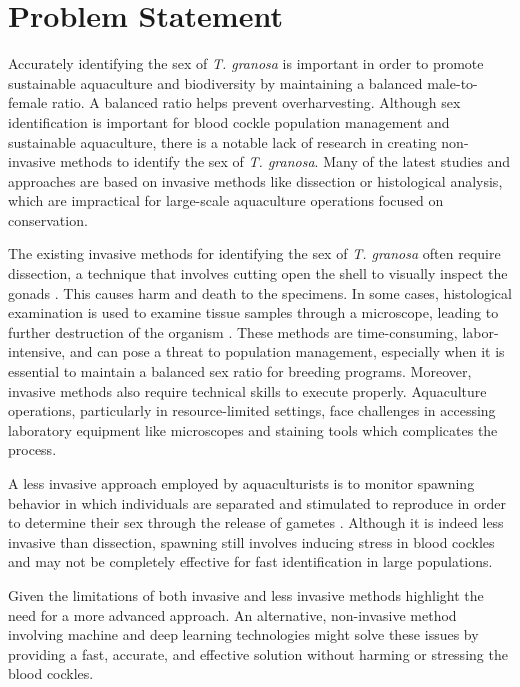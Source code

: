 \section{Problem Statement}

Accurately identifying the sex of \textit{T. granosa} is important in order to promote sustainable aquaculture and biodiversity by maintaining a balanced male-to-female ratio. A balanced ratio helps prevent overharvesting. Although sex identification is important for blood cockle population management and sustainable aquaculture, there is a notable lack of research in creating non-invasive methods to identify the sex of \textit{T. granosa}. Many of the latest studies and approaches are based on invasive methods like dissection or histological analysis, which are impractical for large-scale aquaculture operations focused on conservation.

The existing invasive methods for identifying the sex of \textit{T. granosa} often require dissection, a technique that involves cutting open the shell to visually inspect the gonads \cite{erica2018}. This causes harm and death to the specimens. In some cases, histological examination is used to examine tissue samples through a microscope, leading to further destruction of the organism \cite{may2021}. These methods are time-consuming, labor-intensive, and can pose a threat to population management, especially when it is essential to maintain a balanced sex ratio for breeding programs. Moreover, invasive methods also require technical skills to execute properly. Aquaculture operations, particularly in resource-limited settings, face challenges in accessing laboratory equipment like microscopes and staining tools which complicates the process.

A less invasive approach employed by aquaculturists is to monitor spawning behavior in which individuals are separated and stimulated to reproduce in order to determine their sex through the release of gametes \cite{miranda2023}. Although it is indeed less invasive than dissection, spawning still involves inducing stress in blood cockles and may not be completely effective for fast identification in large populations.

Given the limitations of both invasive and less invasive methods highlight the need for a more advanced approach. An alternative, non-invasive method involving machine and deep learning technologies might solve these issues by providing a fast, accurate, and effective solution without harming or stressing the blood cockles.

